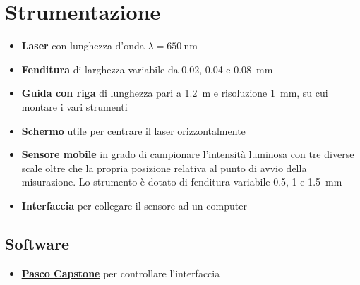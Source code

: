 \documentclass[../main.tex]{subfiles}
\begin{document}
\section{Strumentazione}

\begin{itemize}
    \item \textbf{Laser} con lunghezza d'onda $\lambda = \qty{650}{\nano\meter}$
    \item \textbf{Fenditura} di larghezza variabile da \num{0.02}, \num{0.04} e \qty{0.08}{\milli\meter}
    \item \textbf{Guida con riga} di lunghezza pari a \qty{1.2}{\meter} e risoluzione \qty{1}{\milli\meter}, su cui montare i vari strumenti
    \item \textbf{Schermo} utile per centrare il laser orizzontalmente
    \item \textbf{Sensore mobile} in grado di campionare l'intensità luminosa con tre diverse scale oltre che la propria posizione relativa al punto di avvio della misurazione. Lo strumento è dotato di fenditura variabile \num{0.5}, \num{1} e \qty{1.5}{\milli\meter}
    \item \textbf{Interfaccia} per collegare il sensore ad un computer
\end{itemize}

\subsection{Software}

\begin{itemize}
    \item \textbf{\href{https://www.pasco.com/downloads/capstone}{\underline{Pasco Capstone}}} per controllare l'interfaccia
\end{itemize}
\end{document}
